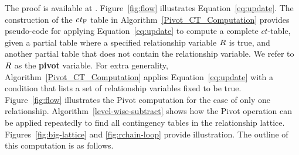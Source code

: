 \documentclass{sig-alternate-2013}
\newcommand{\ct}{\mathit{ct}}
\begin{document}
The proof is available at \cite{Qian2014}. Figure~\ref{fig:flow} illustrates Equation~\eqref{eq:update}. 
The construction of the $\ct_{\false}$ table in 
Algorithm~\ref{Pivot_CT_Computation} provides pseudo-code for applying Equation~\eqref{eq:update} to compute a complete $\ct$-table, given a partial table where a specified relationship variable $R$  is true,
and another partial table that does not contain the relationship variable. 
We refer to $R$ as the \textbf{pivot} variable. 
For extra generality, Algorithm~\ref{Pivot_CT_Computation} applies Equation~\eqref{eq:update} with a condition that lists a set of relationship variables fixed to be true.  Figure~\ref{fig:flow} illustrates the  Pivot computation for the case of only one relationship. 
Algorithm~\ref{level-wise-subtract} shows how the Pivot operation can be applied repeatedly to find all contingency tables in the relationship lattice. Figures~\ref{fig:big-lattice} and \ref{fig:rchain-loop} provide illustration. The outline of this computation is as follows. 
%

%
%
\end{document}
